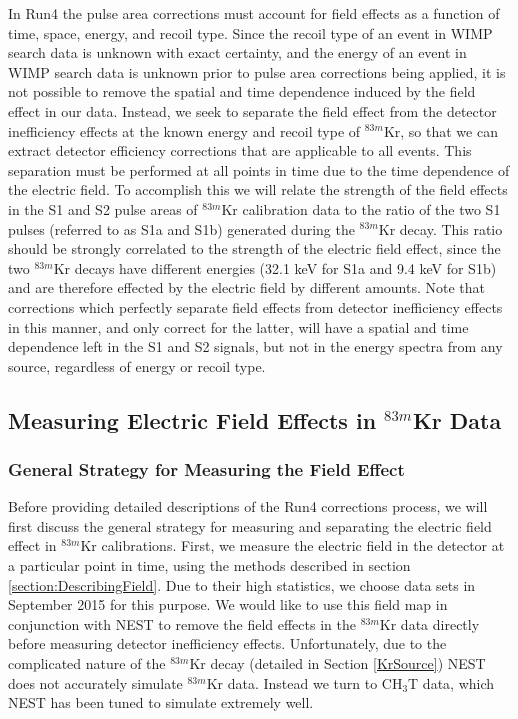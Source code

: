 In Run4 the pulse area corrections must account for field effects as a function of time, space, energy, and recoil type.  Since the recoil type of an event in WIMP search data is unknown with exact certainty, and the energy of an event in WIMP search data is unknown prior to pulse area corrections being applied, it is not possible to remove the spatial and time dependence induced by the field effect in our data.  Instead, we seek to separate the field effect from the detector inefficiency effects at the known energy and recoil type of $^{83m}$Kr, so that we can extract detector efficiency corrections that are applicable to all events.  This separation must be performed at all points in time due to the time dependence of the electric field.  To accomplish this we will relate the strength of the field effects in the S1 and S2 pulse areas of $^{83m}$Kr calibration data to the ratio of the two S1 pulses (referred to as S1a and S1b) generated during the $^{83m}$Kr decay.  This ratio should be strongly correlated to the strength of the electric field effect, since the two $^{83m}$Kr decays have different energies (32.1 keV for S1a and 9.4 keV for S1b) and are therefore effected by the electric field by different amounts.  Note that corrections which perfectly separate field effects from detector inefficiency effects in this manner, and only correct for the latter, will have a spatial and time dependence left in the S1 and S2 signals, but not in the energy spectra from any source, regardless of energy or recoil type.

\subsection{Measuring Electric Field Effects in $^{83m}$Kr Data}

\subsubsection{General Strategy for Measuring the Field Effect} \label{section:GenStrat}

Before providing detailed descriptions of the Run4 corrections process, we will first discuss the general strategy for measuring and separating the electric field effect in $^{83m}$Kr calibrations.  First, we measure the electric field in the detector at a particular point in time, using the methods described in section \ref{section:DescribingField}. Due to their high statistics, we choose data sets in September 2015 for this purpose. We would like to use this field map in conjunction with NEST to remove the field effects in the $^{83m}$Kr data directly before measuring detector inefficiency effects.  Unfortunately, due to the complicated nature of the $^{83m}$Kr decay (detailed in Section \ref{KrSource}) NEST does not accurately simulate $^{83m}$Kr data.  Instead we turn to CH$_3$T data, which NEST has been tuned to simulate extremely well.  

